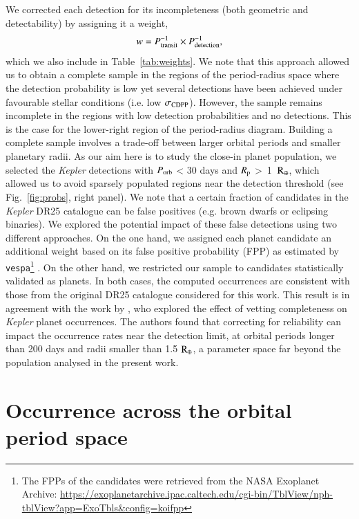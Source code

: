 \documentclass[]{aa}
\begin{document}
We corrected each detection for its incompleteness (both geometric and detectability) by assigning it a weight,
\begin{equation}
    w = P_{\rm transit}^{-1} \times P_{\rm detection}^{-1} ,
\end{equation}
which we also include in Table~\ref{tab:weights}. We note that this approach allowed us to obtain a complete sample in the regions of the period-radius space where the detection probability is low yet several detections have been achieved under favourable stellar conditions (i.e. low $\sigma_{\rm CDPP}$). However, the sample remains incomplete in the regions with low detection probabilities and no detections. This is the case for the lower-right region of the period-radius diagram. Building a complete sample involves a trade-off between larger orbital periods and smaller planetary radii. As our aim here is to study the close-in planet population, we selected the \textit{Kepler} detections with $P_{\rm orb}$ < 30 days and $R_{\rm p}$ >~1~$\rm R_{\rm \oplus}$, which allowed us to avoid sparsely populated regions near the detection threshold (see Fig.~\ref{fig:probs}, right panel). We note that a certain fraction of candidates in the \textit{Kepler} DR25 catalogue can be false positives (e.g. brown dwarfs or eclipsing binaries). We explored the potential impact of these false detections using two different approaches. On the one hand, we assigned each planet candidate an additional weight based on its false positive probability (FPP) as estimated by \texttt{vespa}\footnote{The FPPs of the candidates were retrieved from the NASA Exoplanet Archive: \url{https://exoplanetarchive.ipac.caltech.edu/cgi-bin/TblView/nph-tblView?app=ExoTbls&config=koifpp}} \citep{2016ApJ...822...86M}. On the other hand, we restricted our sample to candidates statistically validated as planets. In both cases, the computed occurrences are consistent with those from the original DR25 catalogue considered for this work. This result is in agreement with the work by \citet{2020AJ....159..279B}, who explored the effect of vetting completeness on \textit{Kepler} planet occurrences. The authors found that correcting for reliability can impact the occurrence rates near the detection limit, at orbital periods longer than 200 days and radii smaller than 1.5 $\rm R_{\oplus}$, a parameter space far beyond the population analysed in the present work. 

\section{Occurrence across the orbital period space}
\label{sec:oc}
\end{document}
